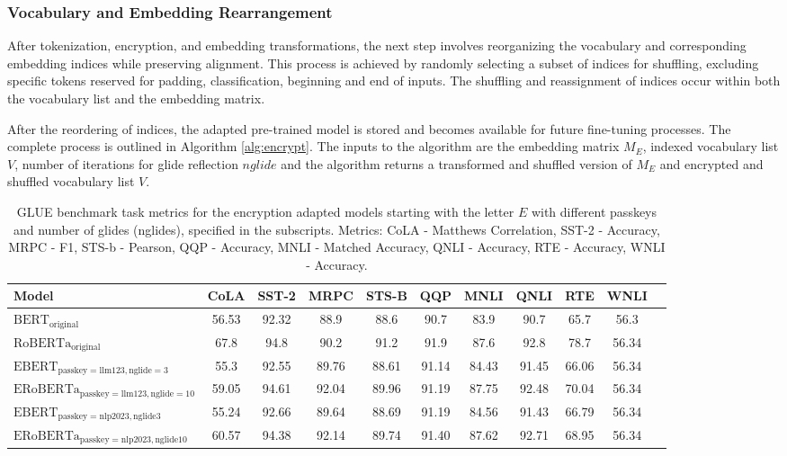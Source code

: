 \documentclass[letterpaper]{article} %
\begin{document}
\subsubsection{Vocabulary and Embedding Rearrangement}
After tokenization, encryption, and embedding transformations, the next step involves reorganizing the vocabulary and corresponding embedding indices while preserving alignment. This process is achieved by randomly selecting a subset of indices for shuffling, excluding specific tokens reserved for padding, classification, beginning and end of inputs. The shuffling and reassignment of indices occur within both the vocabulary list and the embedding matrix. 

After the reordering of indices, the adapted pre-trained model is stored and becomes available for future fine-tuning processes. The complete process is outlined in Algorithm \ref{alg:encrypt}. The inputs to the algorithm are the embedding matrix $M_E$, indexed vocabulary list $V$, number of iterations for glide reflection $nglide$ and the algorithm returns a transformed and shuffled version of $M_E$ and encrypted and shuffled vocabulary list $V$. 
\begin{table}[t]
    \centering
    \footnotesize
    \begin{tabular}{lcccccccccc}
        \toprule
        \textbf{Model} & \textbf{CoLA} & \textbf{SST-2} & \textbf{MRPC} & \textbf{STS-B} & \textbf{QQP} & \textbf{MNLI} & \textbf{QNLI} & \textbf{RTE} & \textbf{WNLI} \\
        \midrule
        $\mathrm{BERT_{original}}$ & 56.53 & 92.32 & 88.9 & 88.6 & 90.7 & 83.9 & 90.7 & 65.7 & 56.3 \\
        $\mathrm{RoBERTa_{original}}$ & 67.8 & 94.8 & 90.2 & 91.2 & 91.9 & 87.6 & 92.8 & 78.7 & 56.34 \\
        $\mathrm{EBERT_{passkey=llm123, nglide=3}}$  & 55.3 & 92.55 & 89.76 & 88.61 & 91.14 & 84.43 & 91.45 & 66.06 & 56.34 \\
        $\mathrm{ERoBERTa_{passkey=llm123, nglide=10}}$  & 59.05 & 94.61 & 92.04 & 89.96 & 91.19 & 87.75 & 92.48 & 70.04 & 56.34 \\
        $\mathrm{EBERT_{passkey=nlp2023, nglide3}}$  & 55.24 & 92.66 & 89.64 & 88.69 & 91.19 & 84.56 & 91.43 & 66.79 & 56.34 \\
        $\mathrm{ERoBERTa_{passkey=nlp2023, nglide10}}$ & 60.57 & 94.38 & 92.14 & 89.74 & 91.40 & 87.62 & 92.71 & 68.95 & 56.34 \\
        \bottomrule
    \end{tabular}
    \caption{GLUE benchmark task metrics for the encryption adapted models starting with the letter $E$ with different passkeys and number of glides (nglides), specified in the subscripts. Metrics: CoLA - Matthews Correlation, SST-2 - Accuracy, MRPC - F1, STS-b - Pearson, QQP - Accuracy, MNLI - Matched Accuracy, QNLI - Accuracy, RTE - Accuracy, WNLI - Accuracy.}
    \label{tab:glueresults}
\end{table}
\end{document}
